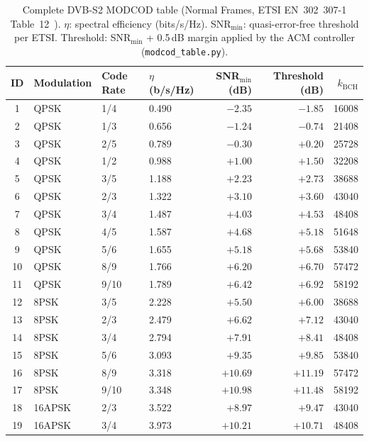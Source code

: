 \documentclass[12pt,a4paper]{report}
\begin{document}
\begin{table}[H]
\centering
\caption{Complete DVB-S2 MODCOD table (Normal Frames, ETSI EN~302~307-1 Table~12~\cite{etsi_dvbs2,bischl2010}).
$\eta$: spectral efficiency (bits/s/Hz). SNR$_{\min}$: quasi-error-free threshold per ETSI.
Threshold: SNR$_{\min}$ + 0.5\,dB margin applied by the ACM controller (\texttt{modcod\_table.py}).}
\label{tab:modcod_full}
\begin{tabular}{clllrrr}
\toprule
\textbf{ID} & \textbf{Modulation} & \textbf{Code Rate} &
\textbf{$\eta$ (b/s/Hz)} & \textbf{SNR$_{\min}$ (dB)} &
\textbf{Threshold (dB)} & \textbf{$k_{\text{BCH}}$}\\
\midrule
 1  & QPSK    & 1/4  & 0.490 & $-2.35$ & $-1.85$ & 16008 \\
 2  & QPSK    & 1/3  & 0.656 & $-1.24$ & $-0.74$ & 21408 \\
 3  & QPSK    & 2/5  & 0.789 & $-0.30$ & $+0.20$ & 25728 \\
 4  & QPSK    & 1/2  & 0.988 & $+1.00$ & $+1.50$ & 32208 \\
 5  & QPSK    & 3/5  & 1.188 & $+2.23$ & $+2.73$ & 38688 \\
 6  & QPSK    & 2/3  & 1.322 & $+3.10$ & $+3.60$ & 43040 \\
 7  & QPSK    & 3/4  & 1.487 & $+4.03$ & $+4.53$ & 48408 \\
 8  & QPSK    & 4/5  & 1.587 & $+4.68$ & $+5.18$ & 51648 \\
 9  & QPSK    & 5/6  & 1.655 & $+5.18$ & $+5.68$ & 53840 \\
10  & QPSK    & 8/9  & 1.766 & $+6.20$ & $+6.70$ & 57472 \\
11  & QPSK    & 9/10 & 1.789 & $+6.42$ & $+6.92$ & 58192 \\
\midrule
12  & 8PSK    & 3/5  & 2.228 & $+5.50$ & $+6.00$ & 38688 \\
13  & 8PSK    & 2/3  & 2.479 & $+6.62$ & $+7.12$ & 43040 \\
14  & 8PSK    & 3/4  & 2.794 & $+7.91$ & $+8.41$ & 48408 \\
15  & 8PSK    & 5/6  & 3.093 & $+9.35$ & $+9.85$ & 53840 \\
16  & 8PSK    & 8/9  & 3.318 & $+10.69$& $+11.19$& 57472 \\
17  & 8PSK    & 9/10 & 3.348 & $+10.98$& $+11.48$& 58192 \\
\midrule
18  & 16APSK  & 2/3  & 3.522 & $+8.97$ & $+9.47$ & 43040 \\
19  & 16APSK  & 3/4  & 3.973 & $+10.21$& $+10.71$& 48408 \\

\end{tabular}
\end{table}
\end{document}
